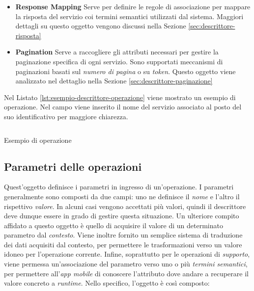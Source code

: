 \begin{itemize}
	\item \textbf{Response Mapping}
	Serve per definire le regole di associazione per mappare la risposta del servizio coi termini semantici utilizzati dal sistema. Maggiori dettagli su questo oggetto vengono discussi nella Sezione \ref{sec:descrittore-risposta}
	\item \textbf{Pagination}
	Serve a raccogliere gli attributi necessari per gestire la paginazione specifica di ogni servizio. Sono supportati meccanismi di paginazioni basati sul \emph{numero di pagina} o su \emph{token}. Questo oggetto viene analizzato nel dettaglio nella Sezione \ref{sec:descrittore-paginazione}
\end{itemize}

Nel Listato \ref{lst:esempio-descrittore-operazione} viene mostrato un esempio di operazione. Nel campo  viene inserito il nome del servizio associato al posto del suo identificativo per maggiore chiarezza.

\begin{listing}[H]
	\inputminted{json}{5-implementazione-backend/Codice/esempio_descrittore_operazione.json}
	\caption{Esempio di operazione}
	\label{lst:esempio-descrittore-operazione}
\end{listing}

\subsection{Parametri delle operazioni\label{sec:descrittore-parametri}}

Quest'oggetto definisce i parametri in ingresso di un'operazione. I parametri generalmente sono composti da due campi: uno ne definisce il \emph{nome} e l'altro il rispettivo \emph{valore}. In alcuni casi vengono accettati più valori, quindi il descrittore deve dunque essere in grado di gestire questa situazione. Un ulteriore compito affidato a questo oggetto è quello di acquisire il valore di un determinato parametro dal \emph{contesto}. Viene inoltre fornito un semplice sistema di traduzione dei dati acquisiti dal contesto, per permettere le trasformazioni verso un valore idoneo per l'operazione corrente. Infine, soprattutto per le operazioni di \emph{supporto}, viene permessa un'associazione del parametro verso uno o più \emph{termini semantici}, per permettere all'\emph{app mobile} di conoscere l'attributo dove andare a recuperare il valore concreto a \emph{runtime}. Nello specifico, l'oggetto è così composto:

